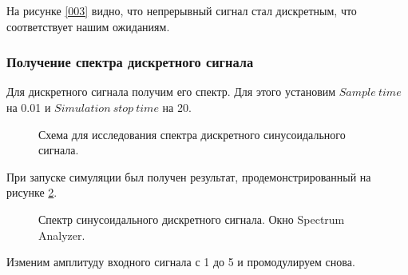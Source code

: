 \documentclass[a4paper,14pt]{extarticle}
\begin{document}
На рисунке \ref{003} видно, что непрерывный сигнал стал 
дискретным, что соответствует нашим ожиданиям.

\subsubsection{Получение спектра дискретного сигнала}

Для дискретного сигнала получим его спектр. Для этого установим 
$Sample \ time$ на 0.01 и $Simulation \ stop \ time$ на 20.

\begin{figure}[H]
\caption{Схема для исследования спектра дискретного 
синусоидального сигнала.}
\label{004}
\end{figure}

При запуске симуляции был получен результат, продемонстрированный 
на рисунке \ref{005}.

\begin{figure}[H]
\caption{Спектр синусоидального дискретного сигнала. Окно 
Spectrum Analyzer.}
\label{005}
\end{figure}

\newpage

Изменим амплитуду входного сигнала с 1 до 5 и промодулируем 
снова.
\end{document}
